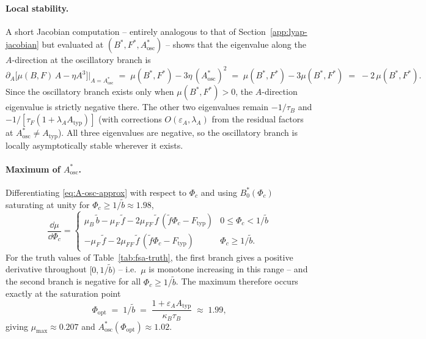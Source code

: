 \paragraph{Local stability.} A short Jacobian computation -- entirely
analogous to that of Section~\ref{app:lyap-jacobian} but evaluated at
$(B^*,F^*,A^*_{\mathrm{osc}})$ -- shows that the eigenvalue along
the $A$-direction at the oscillatory branch is
\begin{equation*}
  \partial_A\bigl[\mu(B,F)\,A - \eta A^3\bigr]\Big|_{A=A^*_{\mathrm{osc}}}
  \;=\; \mu(B^*,F^*) - 3\eta\,(A^*_{\mathrm{osc}})^2
  \;=\; \mu(B^*,F^*) - 3\mu(B^*,F^*) \;=\; -2\,\mu(B^*,F^*).
\end{equation*}
Since the oscillatory branch exists only when $\mu(B^*,F^*) > 0$,
the $A$-direction eigenvalue is strictly negative there. The other
two eigenvalues remain $-1/\tau_B$ and
$-1/[\tau_F(1+\lambda_A A_{\mathrm{typ}})]$ (with corrections
$O(\varepsilon_A,\lambda_A)$ from the residual factors at
$A^*_{\mathrm{osc}} \neq A_{\mathrm{typ}}$). All three eigenvalues
are negative, so the oscillatory branch is locally asymptotically
stable wherever it exists.

\paragraph{Maximum of $A^*_{\mathrm{osc}}$.} Differentiating
\eqref{eq:A-osc-approx} with respect to $\Phi_c$ and using
$B^*_0(\Phi_c)$ saturating at unity for $\Phi_c \ge 1/\tilde b
\approx 1.98$,
\begin{equation*}
  \frac{\dd \mu}{\dd \Phi_c}
   = \begin{cases}
     \mu_B\,\tilde b - \mu_F\,\tilde f - 2\mu_{FF}\,\tilde f\,(\tilde f\Phi_c - F_{\mathrm{typ}})
        & 0 \le \Phi_c < 1/\tilde b \\[4pt]
     -\mu_F\,\tilde f - 2\mu_{FF}\,\tilde f\,(\tilde f\Phi_c - F_{\mathrm{typ}})
        & \Phi_c \ge 1/\tilde b.
   \end{cases}
\end{equation*}
For the truth values of Table~\ref{tab:fsa-truth}, the first branch
gives a positive derivative throughout $[0, 1/\tilde b)$ -- i.e.\
$\mu$ is monotone increasing in this range -- and the second
branch is negative for all $\Phi_c \ge 1/\tilde b$. The maximum
therefore occurs exactly at the saturation point
\begin{equation}
  \Phi_{\mathrm{opt}} \;=\; 1/\tilde b
   \;=\; \frac{1+\varepsilon_A A_{\mathrm{typ}}}{\kappa_B \tau_B}
   \;\approx\; 1.99,
  \label{eq:Phi-opt}
\end{equation}
giving $\mu_{\max} \approx 0.207$ and
$A^*_{\mathrm{osc}}(\Phi_{\mathrm{opt}}) \approx 1.02$.

